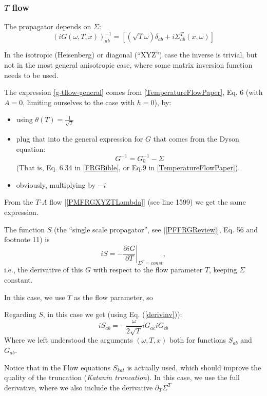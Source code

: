 \documentclass{article}
\begin{document}
\subsubsection{$T$ flow}
The propagator depends on $\Sigma$:
\begin{equation}
  \label{g-tflow-general}
  {(iG(\omega,T,x))}^{-1}_{ab} = \left[\left(\sqrt{T} \omega\right) \delta_{ab} +  i\Sigma^T_{ab}(x,\omega) \right]
\end{equation}

In the isotropic (Heisenberg) or diagonal (``XYZ'') case
the inverse is trivial, but not in the most general anisotropic case,
where some matrix inversion function needs to be used.

The expression \ref{g-tflow-general} comes from \ref{TemperatureFlowPaper}, Eq. 6
(with $A=0$, limiting ourselves to the case with $h=0$), by:
\begin{itemize}
\item using $\theta(T) = \frac{1}{\sqrt{T}}$
\item plug that into the general expression for $G$ that comes from the Dyson equation:
  \begin{equation}
    G^{-1} = G^{-1}_0 - \Sigma
  \end{equation}
  (That is, Eq. 6.34 in \ref{FRGBible}, or Eq.9 in \ref{TemperatureFlowPaper}).
\item obviously, multiplying by $-i$
\end{itemize}

From the $T$-$\Lambda$ flow [\ref{PMFRGXYZTLambda}] (see line 1599) we get the same expression.

The function $S$ (the ``single scale propagator'', see [\ref{PFFRGReview}], Eq. 56 and footnote 11)
is
\begin{equation}
  iS = -\left. \frac{\partial iG}{\partial T} \right|_{\Sigma^T = const} ,
\end{equation}
i.e., the derivative of this $G$ with respect to the flow parameter $T$, keeping $\Sigma$ constant.

In this case, we use $T$ as the flow parameter, so

Regarding $S$, in this case we get (using Eq. (\ref{derivinv})):
\begin{equation}
  iS_{ab} = -\frac{\omega}{2\sqrt{T}} iG_{ac} iG_{cb}
\end{equation}
Where we left understood the arguments $(\omega,T,x)$ both for functions $S_{ab}$ and $G_{ab}$.

Notice that in the Flow equations $S_{kat}$ is actually used,
which should improve the quality of the truncation (\emph{Katanin truncation}).
In this case, we use the full derivative,
where we also include the derivative $\partial_T \Sigma^T$
\end{document}
